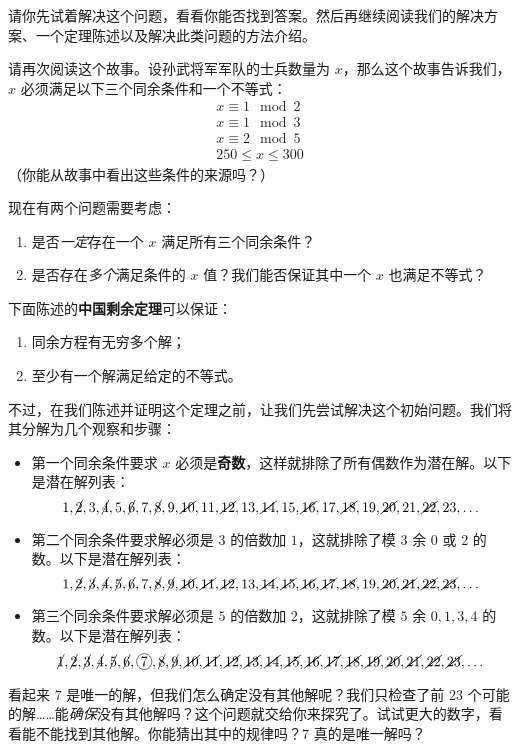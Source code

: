 请你先试着解决这个问题，看看你能否找到答案。然后再继续阅读我们的解决方案、一个定理陈述以及解决此类问题的方法介绍。

请再次阅读这个故事。设孙武将军军队的士兵数量为 $x$，那么这个故事告诉我们，$x$ 必须满足以下三个同余条件和一个不等式：
\begin{align*}
    x \equiv 1 \mod 2 \\
    x \equiv 1 \mod 3 \\
    x \equiv 2 \mod 5 \\
    250 \le x \le 300
\end{align*}
（你能从故事中看出这些条件的来源吗？）

现在有两个问题需要考虑：
\begin{enumerate}[label=(\arabic*)]
    \item 是否\emph{一定}存在一个 $x$ 满足所有三个同余条件？
    \item 是否存在\emph{多个}满足条件的 $x$ 值？我们能否保证其中一个 $x$ 也满足不等式？
\end{enumerate}

下面陈述的\textbf{中国剩余定理}可以保证：
\begin{enumerate}[label=(\arabic*)]
    \item 同余方程有无穷多个解；
    \item 至少有一个解满足给定的不等式。
\end{enumerate}
不过，在我们陈述并证明这个定理之前，让我们先尝试解决这个初始问题。我们将其分解为几个观察和步骤：
\begin{itemize}
    \item 第一个同余条件要求 $x$ 必须是\textbf{奇数}，这样就排除了所有偶数作为潜在解。以下是潜在解列表：
    \[1,\cancel{2}, 3, \cancel{4}, 5, \cancel{6}, 7, \cancel{8}, 9,\cancel{10}, 11,\cancel{12}, 13,\cancel{14}, 15,\cancel{16}, 17,\cancel{18}, 19,\cancel{20}, 21,\cancel{22}, 23, \dots\]
    \item 第二个同余条件要求解必须是 $3$ 的倍数加 $1$，这就排除了模 $3$ 余 $0$ 或 $2$ 的数。以下是潜在解列表：
    \[1,\cancel{2}, \cancel{3}, \cancel{4}, \cancel{5}, \cancel{6}, 7, \cancel{8}, \cancel{9},\cancel{10}, \cancel{11},\cancel{12}, 13,\cancel{14}, \cancel{15},\cancel{16}, \cancel{17},\cancel{18}, 19,\cancel{20}, \cancel{21},\cancel{22}, \cancel{23}, \dots\]
    \item 第三个同余条件要求解必须是 $5$ 的倍数加 $2$，这就排除了模 $5$ 余 $0, 1, 3, 4$ 的数。以下是潜在解列表：
    \[\cancel{1},\cancel{2}, \cancel{3}, \cancel{4}, \cancel{5}, \cancel{6}, \circled{7}, \cancel{8}, \cancel{9},\cancel{10}, \cancel{11},\cancel{12}, \cancel{13},\cancel{14}, \cancel{15},\cancel{16}, \cancel{17},\cancel{18}, \cancel{19},\cancel{20}, \cancel{21},\cancel{22}, \cancel{23}, \dots\]
\end{itemize}
看起来 $7$ 是唯一的解，但我们怎么确定没有其他解呢？我们只检查了前 $23$ 个可能的解……能\emph{确保}没有其他解吗？这个问题就交给你来探究了。试试更大的数字，看看能不能找到其他解。你能猜出其中的规律吗？$7$ 真的是唯一解吗？


